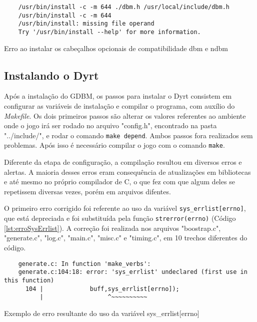 \begin{listing}[!ht]
    \begin{verbatim}
    /usr/bin/install -c -m 644 ./dbm.h /usr/local/include/dbm.h
    /usr/bin/install -c -m 644
    /usr/bin/install: missing file operand
    Try '/usr/bin/install --help' for more information.
    \end{verbatim}
\caption{Erro ao instalar os cabeçalhos opcionais de compatibilidade dbm e ndbm}
\label{lst:errorInstallCompat}
\end{listing}

\subsection{Instalando o Dyrt}

Após a instalação do GDBM, os passos para instalar o Dyrt consistem em configurar as variáveis de instalação 
e compilar o programa, com auxílio do \textit{Makefile}. Os dois primeiros passos são alterar os valores 
referentes ao ambiente onde o jogo irá ser rodado no arquivo "config.h", encontrado na pasta "../include/", 
e rodar o comando \verb|make depend|. Ambos passos fora realizados sem problemas. Após isso é necessário 
compilar o jogo com o comando \verb|make|.

Diferente da etapa de configuração, a compilação resultou em diversos erros e alertas. A maioria desses erros 
eram consequência de atualizações em bibliotecas e até mesmo no próprio compilador de C, o que fez com que 
algum deles se repetissem diversas vezes, porém em arquivos difentes. 

O primeiro erro corrigido foi referente ao uso da variável \verb|sys_errlist[errno]|, que está depreciada 
e foi substituída pela função \verb|strerror(errno)| (Código \ref{lst:erroSysErrlist}). A correção foi 
realizada nos arquivos "boostrap.c", "generate.c", "log.c", "main.c", "misc.c" e "timing.c", em 10 
trechos diferentes do código.

\begin{listing}[!ht]
    \begin{verbatim}
    generate.c: In function 'make_verbs':
    generate.c:104:18: error: 'sys_errlist' undeclared (first use in this function)
      104 |             buff,sys_errlist[errno]);
          |                  ^~~~~~~~~~~
    \end{verbatim}
\caption{Exemplo de erro resultante do uso da variável sys\_errlist[errno]}
\label{lst:erroSysErrlist}
\end{listing}


